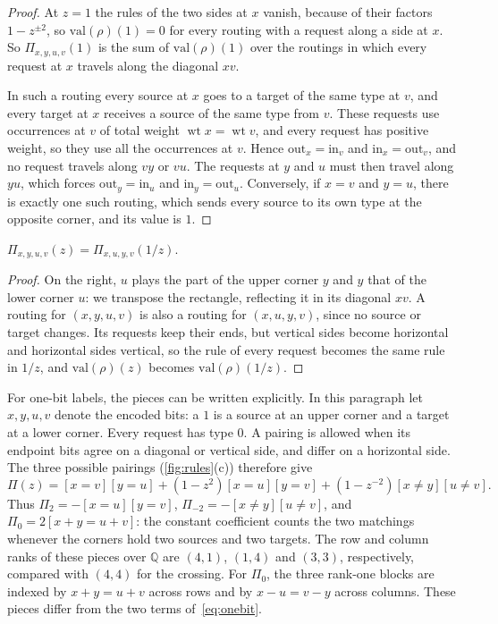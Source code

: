 \documentclass[11pt]{article}
\theoremstyle{definition}
\theoremstyle{definition}
\theoremstyle{remark}
\newcommand{\wt}{\operatorname{wt}}
\newcommand{\out}{\mathrm{out}}
\newcommand{\inn}{\mathrm{in}}
\begin{document}
\begin{proof}
At $z=1$ the rules of the two sides at $x$ vanish, because of their factors $1-z^{\pm2}$, so $\mathrm{val}(\rho)(1)=0$ for every routing with a request along a side at $x$. So $\Pi_{x,y,u,v}(1)$ is the sum of $\mathrm{val}(\rho)(1)$ over the routings in which every request at $x$ travels along the diagonal $xv$.

In such a routing every source at $x$ goes to a target of the same type at $v$, and every target at $x$ receives a source of the same type from $v$. These requests use occurrences at $v$ of total weight $\wt x=\wt v$, and every request has positive weight, so they use all the occurrences at $v$. Hence $\out_x=\inn_v$ and $\inn_x=\out_v$, and no request travels along $vy$ or $vu$. The requests at $y$ and $u$ must then travel along $yu$, which forces $\out_y=\inn_u$ and $\inn_y=\out_u$. Conversely, if $x=v$ and $y=u$, there is exactly one such routing, which sends every source to its own type at the opposite corner, and its value is $1$.
\end{proof}

\begin{lemma}\label{lem:symmetry}
$\Pi_{x,y,u,v}(z)=\Pi_{x,u,y,v}(1/z)$.
\end{lemma}

\begin{proof}
On the right, $u$ plays the part of the upper corner $y$ and $y$ that of the lower corner $u$: we transpose the rectangle, reflecting it in its diagonal $xv$. A routing for $(x,y,u,v)$ is also a routing for $(x,u,y,v)$, since no source or target changes. Its requests keep their ends, but vertical sides become horizontal and horizontal sides vertical, so the rule of every request becomes the same rule in $1/z$, and $\mathrm{val}(\rho)(z)$ becomes $\mathrm{val}(\rho)(1/z)$.
\end{proof}

For one-bit labels, the pieces can be written explicitly. In this paragraph let $x,y,u,v$ denote the encoded bits: a $1$ is a source at an upper corner and a target at a lower corner. Every request has type $0$. A pairing is allowed when its endpoint bits agree on a diagonal or vertical side, and differ on a horizontal side. The three possible pairings (\cref{fig:rules}(c)) therefore give
\[
\Pi(z)=[x=v][y=u]+(1-z^2)[x=u][y=v]+(1-z^{-2})[x\ne y][u\ne v].
\]
Thus $\Pi_2=-[x=u][y=v]$, $\Pi_{-2}=-[x\ne y][u\ne v]$, and $\Pi_0=2[x+y=u+v]$: the constant coefficient counts the two matchings whenever the corners hold two sources and two targets. The row and column ranks of these pieces over $\mathbb Q$ are $(4,1)$, $(1,4)$ and $(3,3)$, respectively, compared with $(4,4)$ for the crossing. For $\Pi_0$, the three rank-one blocks are indexed by $x+y=u+v$ across rows and by $x-u=v-y$ across columns. These pieces differ from the two terms of~\eqref{eq:onebit}.
\end{document}
